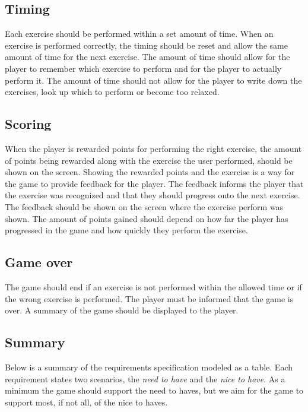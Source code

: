 \documentclass[11pt]{report}
\begin{document}
\subsection{Timing}
Each exercise should be performed within a set amount of time. When an exercise is performed correctly, the timing should be reset and allow the same amount of time for the next exercise. The amount of time should allow for the player to remember which exercise to perform and for the player to actually perform it. The amount of time should not allow for the player to write down the exercises, look up which to perform or become too relaxed.

\subsection{Scoring}
When the player is rewarded points for performing the right exercise, the amount of points being rewarded along with the exercise the user performed, should be shown on the screen. Showing the rewarded points and the exercise is a way for the game to provide feedback for the player. The feedback informs the player that the exercise was recognized and that they should progress onto the next exercise. The feedback should be shown on the screen where the exercise perform was shown. The amount of points gained should depend on how far the player has progressed in the game and how quickly they perform the exercise.

\subsection{Game over}
The game should end if an exercise is not performed within the allowed time or if the wrong exercise is performed. The player must be informed that the game is over. A summary of the game should be displayed to the player.

\subsection{Summary}
Below is a summary of the requirements specification modeled as a table. Each requirement states two scenarios, the \emph{need to have} and the \emph{nice to have}. As a minimum the game should support the need to haves, but we aim for the game to support most, if not all, of the nice to haves. 
\end{document}

